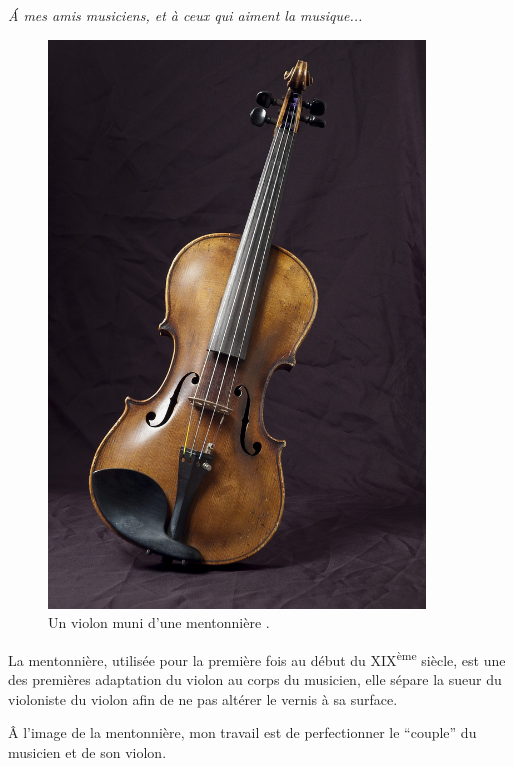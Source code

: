 
\newpage
\begin{flushright}
\phantom{}
\vspace{2cm}
\textit{\'A mes amis musiciens, et à ceux qui aiment la musique...}\par
\vspace{1.5cm}
\end{flushright}
\begin{figure}[h]
\begin{center}
\includegraphics[width=10cm]{images/violin_cover.jpg}
\caption{Un violon muni d'une mentonnière .}
\end{center}
\end{figure}
\par La mentonnière, utilisée pour la première fois au début du XIX\textsuperscript{ème} siècle, est une des premières adaptation du violon au corps du musicien, elle sépare la sueur du violoniste du violon afin de ne pas altérer le vernis à sa surface.

\^A l'image de la mentonnière, mon travail est de perfectionner le ``couple'' du musicien et de son violon.
